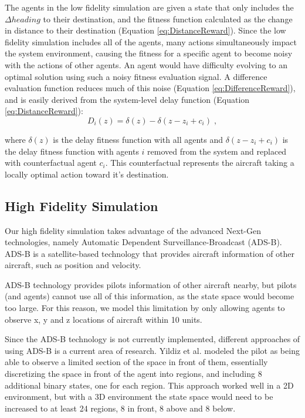 \documentclass{aamas2014}
\begin{document}
The agents in the low fidelity simulation are given a state that only includes the $\Delta heading$ to their destination, and the fitness function calculated as the change in distance to their destination (Equation \ref{eq:DistanceReward}). Since the low fidelity simulation includes all of the agents, many actions simultaneously impact the system environment, causing the fitness for a specific agent to become noisy with the actions of other agents. An agent would have difficulty evolving to an optimal solution using such a noisy fitness evaluation signal. A difference evaluation function reduces much of this noise (Equation \ref{eq:DifferenceReward}), and is easily derived from the system-level delay function (Equation \ref{eq:DistanceReward}):
%
\begin{equation} \label{eq:DistanceReward-Difference}
D_i(z) = \delta(z) - \delta(z - z_i + c_i)\;,
\end{equation}

where $\delta(z)$ is the delay fitness function with all agents and $\delta(z - z_i + c_i)$ is the delay fitness function with agents $i$ removed from the system and replaced with counterfactual agent $c_i$. This counterfactual represents the aircraft taking a locally optimal action toward it's destination. 

\subsection{High Fidelity Simulation}

Our high fidelity simulation takes advantage of the advanced Next-Gen \cite{next-gen} technologies, namely Automatic Dependent Surveillance-Broadcast (ADS-B). ADS-B is a satellite-based technology that provides aircraft information of other aircraft, such as position and velocity. 

ADS-B technology provides pilots information of other aircraft nearby, but pilots (and agents) cannot use all of this information, as the state space would become too large. For this reason, we model this limitation by only allowing agents to observe x, y and z locations of aircraft within 10 units.

Since the ADS-B technology is not currently implemented, different approaches of using ADS-B is a current area of research. Yildiz et al. \cite{Adrian-next-gen} modeled the pilot as being able to observe a limited section of the space in front of them, essentially discretizing the space in front of the agent into regions, and including 8 additional binary states, one for each region. This approach worked well in a 2D environment, but with a 3D environment the state space would need to be increased to at least 24 regions, 8 in front, 8 above and 8 below. 
\end{document}
